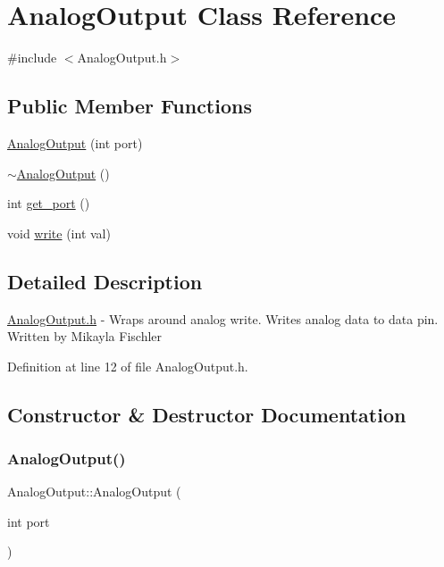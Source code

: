 \hypertarget{class_analog_output}{}\section{Analog\+Output Class Reference}
\label{class_analog_output}


{\ttfamily \#include $<$Analog\+Output.\+h$>$}

\subsection*{Public Member Functions}
\begin{DoxyCompactItemize}
\item 
\hyperlink{class_analog_output_a5bbdf0548ba8a18d090071f1cb447238}{Analog\+Output} (int port)
\item 
\hyperlink{class_analog_output_a7848a6b7b7c15bba5c75f0f82f3c1d53}{$\sim$\+Analog\+Output} ()
\item 
int \hyperlink{class_analog_output_a0a4146612660e06c9d2edfac9b51b6ef}{get\+\_\+port} ()
\item 
void \hyperlink{class_analog_output_aa67e2c25c9377517a72346fc9402afad}{write} (int val)
\end{DoxyCompactItemize}


\subsection{Detailed Description}
\hyperlink{_analog_output_8h}{Analog\+Output.\+h} -\/ Wraps around analog write. Writes analog data to data pin. Written by Mikayla Fischler 

Definition at line 12 of file Analog\+Output.\+h.



\subsection{Constructor \& Destructor Documentation}
\mbox{\label{class_analog_output_a5bbdf0548ba8a18d090071f1cb447238}} 
\subsubsection{\texorpdfstring{Analog\+Output()}{AnalogOutput()}}
{\footnotesize\ttfamily Analog\+Output\+::\+Analog\+Output (\begin{DoxyParamCaption}\item[{int}]{port }\end{DoxyParamCaption})}

